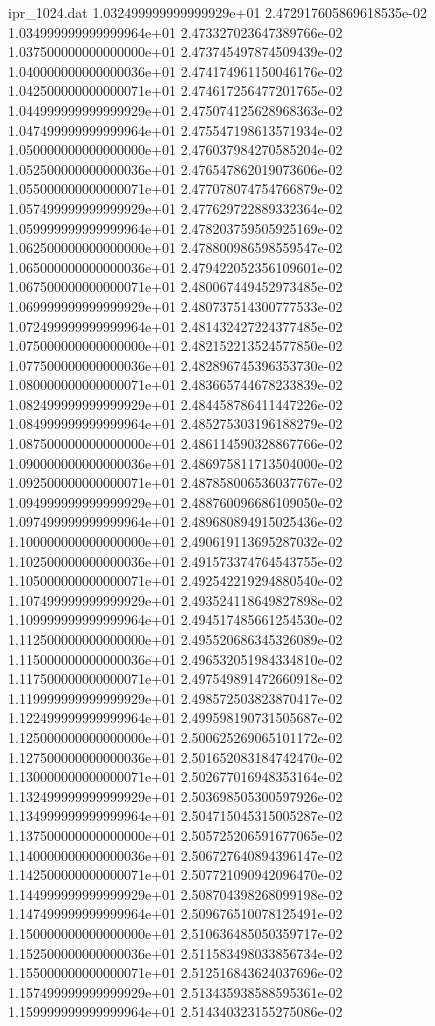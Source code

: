 \begin{filecontents}{ipr_1024.dat}
1.032499999999999929e+01 2.472917605869618535e-02
1.034999999999999964e+01 2.473327023647389766e-02
1.037500000000000000e+01 2.473745497874509439e-02
1.040000000000000036e+01 2.474174961150046176e-02
1.042500000000000071e+01 2.474617256477201765e-02
1.044999999999999929e+01 2.475074125628968363e-02
1.047499999999999964e+01 2.475547198613571934e-02
1.050000000000000000e+01 2.476037984270585204e-02
1.052500000000000036e+01 2.476547862019073606e-02
1.055000000000000071e+01 2.477078074754766879e-02
1.057499999999999929e+01 2.477629722889332364e-02
1.059999999999999964e+01 2.478203759505925169e-02
1.062500000000000000e+01 2.478800986598559547e-02
1.065000000000000036e+01 2.479422052356109601e-02
1.067500000000000071e+01 2.480067449452973485e-02
1.069999999999999929e+01 2.480737514300777533e-02
1.072499999999999964e+01 2.481432427224377485e-02
1.075000000000000000e+01 2.482152213524577850e-02
1.077500000000000036e+01 2.482896745396353730e-02
1.080000000000000071e+01 2.483665744678233839e-02
1.082499999999999929e+01 2.484458786411447226e-02
1.084999999999999964e+01 2.485275303196188279e-02
1.087500000000000000e+01 2.486114590328867766e-02
1.090000000000000036e+01 2.486975811713504000e-02
1.092500000000000071e+01 2.487858006536037767e-02
1.094999999999999929e+01 2.488760096686109050e-02
1.097499999999999964e+01 2.489680894915025436e-02
1.100000000000000000e+01 2.490619113695287032e-02
1.102500000000000036e+01 2.491573374764543755e-02
1.105000000000000071e+01 2.492542219294880540e-02
1.107499999999999929e+01 2.493524118649827898e-02
1.109999999999999964e+01 2.494517485661254530e-02
1.112500000000000000e+01 2.495520686345326089e-02
1.115000000000000036e+01 2.496532051984334810e-02
1.117500000000000071e+01 2.497549891472660918e-02
1.119999999999999929e+01 2.498572503823870417e-02
1.122499999999999964e+01 2.499598190731505687e-02
1.125000000000000000e+01 2.500625269065101172e-02
1.127500000000000036e+01 2.501652083184742470e-02
1.130000000000000071e+01 2.502677016948353164e-02
1.132499999999999929e+01 2.503698505300597926e-02
1.134999999999999964e+01 2.504715045315005287e-02
1.137500000000000000e+01 2.505725206591677065e-02
1.140000000000000036e+01 2.506727640894396147e-02
1.142500000000000071e+01 2.507721090942096470e-02
1.144999999999999929e+01 2.508704398268099198e-02
1.147499999999999964e+01 2.509676510078125491e-02
1.150000000000000000e+01 2.510636485050359717e-02
1.152500000000000036e+01 2.511583498033856734e-02
1.155000000000000071e+01 2.512516843624037696e-02
1.157499999999999929e+01 2.513435938588595361e-02
1.159999999999999964e+01 2.514340323155275086e-02

\end{filecontents}
